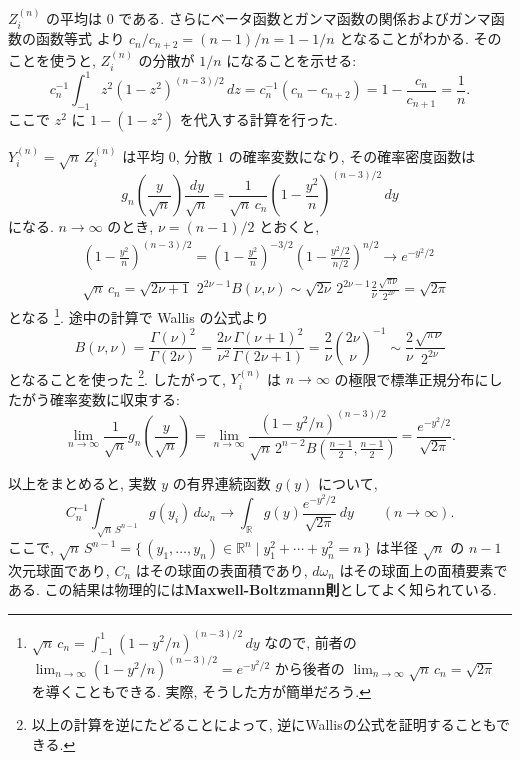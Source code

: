 \documentclass[12pt,twoside]{jarticle}
\newcommand\R{{\mathbb R}} %
\theoremstyle{jplain}
\theoremstyle{jplain}
\theoremstyle{jplain}
\numberwithin{theorem}{section}
\numberwithin{equation}{section}
\numberwithin{figure}{section}
\numberwithin{table}{section}
\begin{document}
$Z^{(n)}_i$ の平均は $0$ である.
さらにベータ函数とガンマ函数の関係およびガンマ函数の函数等式
より $c_n/c_{n+2}=(n-1)/n=1-1/n$ となることがわかる. 
そのことを使うと, $Z^{(n)}_i$ の分散が $1/n$ になることを示せる:
\[
c_n^{-1}\int_{-1}^1 z^2(1-z^2)^{(n-3)/2}\,dz
=c_n^{-1}(c_n-c_{n+2})
=1-\frac{c_n}{c_{n+1}}
=\frac{1}{n}.
\]
ここで $z^2$ に $1-(1-z^2)$ を代入する計算を行った. 

$Y^{(n)}_i=\sqrt{n}\,Z^{(n)}_i$ は平均 $0$, 分散 $1$ の確率変数になり, その確率密度函数は
\[
g_n\left(\frac{y}{\sqrt{n}}\right)\frac{dy}{\sqrt{n}}
=\frac{1}{\sqrt{n}\,c_n} \left(1-\frac{y^2}{n}\right)^{(n-3)/2}\,dy
\] 
になる.  $n\to\infty$ のとき, $\nu=(n-1)/2$ とおくと, 
\begin{align*}
&
\left(1-\frac{y^2}{n}\right)^{(n-3)/2}
=\left(1-\frac{y^2}{n}\right)^{-3/2} \left(1-\frac{y^2/2}{n/2}\right)^{n/2}
\longrightarrow e^{-y^2/2}
\\ &
\sqrt{n}\,c_n
=\sqrt{2\nu+1}\,\,2^{2\nu-1}B(\nu,\nu)
\sim
\sqrt{2\nu}\,2^{2\nu-1}\frac{2}{\nu}\frac{\sqrt{\pi\nu}}{2^{2\nu}}
=\sqrt{2\pi}
\end{align*}
となる%
\footnote{$\sqrt{n}\,c_n=\int_{-1}^1(1-y^2/n)^{(n-3)/2}\,dy$ なので,
前者の \(
\lim_{n\to\infty}(1-y^2/n)^{(n-3)/2}=e^{-y^2/2}
\) から後者の $\lim_{n\to\infty}\sqrt{n}\,c_n=\sqrt{2\pi}$ を導くこともできる.
実際, そうした方が簡単だろう. }. %
途中の計算で Wallis の公式より
\[
B(\nu,\nu) 
= \frac{\Gamma(\nu)^2}{\Gamma(2\nu)}
= \frac{2\nu}{\nu^2}\frac{\Gamma(\nu+1)^2}{\Gamma(2\nu+1)}
= \frac{2}{\nu}\binom{2\nu}{\nu}^{-1}
\sim \frac{2}{\nu}\frac{\sqrt{\pi\nu}}{2^{2\nu}}
\]
となることを使った%
\footnote{以上の計算を逆にたどることによって, 逆にWallisの公式を証明することもできる.}. 
したがって, $Y^{(n)}_i$ は $n\to\infty$ の極限で標準正規分布にしたがう確率変数に収束する:
\[
\lim_{n\to\infty}
\frac{1}{\sqrt{n}}g_n\left(\frac{y}{\sqrt{n}}\right)
=\lim_{n\to\infty}
\frac{(1-y^2/n)^{(n-3)/2}}{\sqrt{n}\,2^{n-2}B(\frac{n-1}{2},\frac{n-1}{2})}
=\frac{e^{-y^2/2}}{\sqrt{2\pi}}.
\]

以上をまとめると, 実数 $y$ の有界連続函数 $g(y)$ について,  
\[
C_n^{-1}\int_{\sqrt{n}\,S^{n-1}} g(y_i) \,d\omega_n
\longrightarrow
\int_\R g(y)\frac{e^{-y^2/2}}{\sqrt{2\pi}}\,dy
\qquad (n\to\infty).
\]
ここで, $\sqrt{n}\,S^{n-1}=\{\,(y_1,\ldots,y_n)\in\R^n\mid y_1^2+\cdots+y_n^2=n \,\}$
は半径 $\sqrt{n}$ の $n-1$ 次元球面であり, 
$C_n$ はその球面の表面積であり, 
$d\omega_n$ はその球面上の面積要素である.
この結果は物理的には{\bf Maxwell-Boltzmann則}としてよく知られている.
\end{document}
